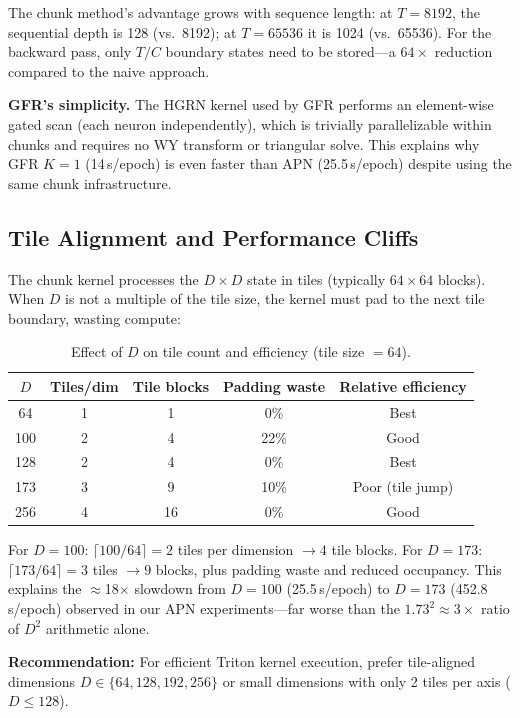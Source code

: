 \documentclass[11pt,a4paper]{article}
\begin{document}
The chunk method's advantage grows with sequence length: at $T=8192$, the sequential depth is 128 (vs.\ 8192); at $T=65536$ it is 1024 (vs.\ 65536).
For the backward pass, only $T/C$ boundary states need to be stored---a $64\times$ reduction compared to the naive approach.

\textbf{GFR's simplicity.} The HGRN kernel used by GFR performs an element-wise gated scan (each neuron independently), which is trivially parallelizable within chunks and requires no WY transform or triangular solve. This explains why GFR $K{=}1$ (14\,s/epoch) is even faster than APN (25.5\,s/epoch) despite using the same chunk infrastructure.

\subsection{Tile Alignment and Performance Cliffs}

The chunk kernel processes the $D \times D$ state in tiles (typically $64 \times 64$ blocks).
When $D$ is not a multiple of the tile size, the kernel must pad to the next tile boundary, wasting compute:

\begin{table}[h]
\centering
\caption{Effect of $D$ on tile count and efficiency (tile size $=64$).}
\label{tab:tiling}
\begin{tabular}{ccccc}
\toprule
$D$ & Tiles/dim & Tile blocks & Padding waste & Relative efficiency \\
\midrule
64 & 1 & 1 & 0\% & Best \\
100 & 2 & 4 & 22\% & Good \\
128 & 2 & 4 & 0\% & Best \\
173 & 3 & 9 & 10\% & Poor (tile jump) \\
256 & 4 & 16 & 0\% & Good \\
\bottomrule
\end{tabular}
\end{table}

For $D=100$: $\lceil 100/64 \rceil = 2$ tiles per dimension $\to 4$ tile blocks.
For $D=173$: $\lceil 173/64 \rceil = 3$ tiles $\to 9$ blocks, plus padding waste and reduced occupancy.
This explains the $\approx$18$\times$ slowdown from $D=100$ (25.5\,s/epoch) to $D=173$ (452.8\,s/epoch) observed in our APN experiments---far worse than the $1.73^2 \approx 3\times$ ratio of $D^2$ arithmetic alone.

\textbf{Recommendation:} For efficient Triton kernel execution, prefer tile-aligned dimensions $D \in \{64, 128, 192, 256\}$ or small dimensions with only 2 tiles per axis ($D \le 128$).
\end{document}
